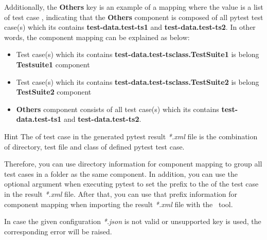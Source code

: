 \begin{itemize}
\begin{itemize}
\begin{itemize}
                Additionally, the \textbf{Others} key is an example of a mapping
                where the value is a list of test case ,
                indicating that the \textbf{Others} component is composed of all
                pytest test case(s) which its  contains
                \textbf{test-data.test-ts1} and \textbf{test-data.test-ts2}.
                \newline
                In other words, the component mapping can be explained as below:
                \begin{itemize}
                  \item Test case(s) which its  contains
                        \textbf{test-data.test-tsclass.TestSuite1} is belong
                        \textbf{Testsuite1} component
                  \item Test case(s) which its  contains
                        \textbf{test-data.test-tsclass.TestSuite2} is belong
                        \textbf{TestSuite2} component
                  \item \textbf{Others} component consists of all test case(s)
                        which its  contains \textbf{test-data.test-ts1}
                        and \textbf{test-data.test-ts2}.
                \end{itemize}

                \begin{boxhint} {Hint}
                  The  of test case in the generated pytest
                  result \emph{*.xml} file is the combination of directory,
                  test file and class of defined pytest test case.

                  Therefore, you can use directory information for component
                  mapping to group all test cases in a folder as the same component.
                  \newline
                  In addition, you can use the optional argument 
                  when executing pytest to set the prefix to the 
                  of the test case in the result \emph{*.xml} file. After that,
                  you can use that prefix information for component mapping when
                  importing the result \emph{*.xml} file with the \pkg\ tool.
                \end{boxhint}
              \end{itemize}
          \end{itemize}

          In case the given configuration \emph{*.json} is not valid or
          unsupported key is used, the corresponding error will be raised.
      \end{itemize}

